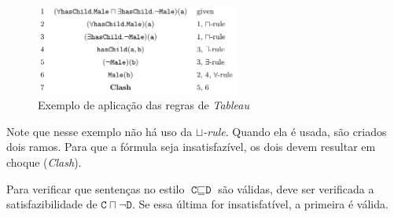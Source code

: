 	\begin{figure}[H]
		\centering
		\includegraphics[width=0.6\textwidth]{Capitulos/Logicas/tableau}
		\caption{Exemplo de aplicação das regras de \textit{Tableau}}
	\end{figure}

Note que nesse exemplo não há uso da \textit{$ \sqcup $-rule}. Quando ela é usada, são criados dois ramos. Para que a fórmula seja insatisfazível, os dois devem resultar em choque (\textit{Clash}).

Para verificar que sentenças no estilo $ \texttt{C} \sqsubseteq \texttt{D} $ são válidas, deve ser verificada a satisfazibilidade de $ \texttt{C} \sqcap \neg \texttt{D} $. Se essa última for insatisfatível, a primeira é válida.